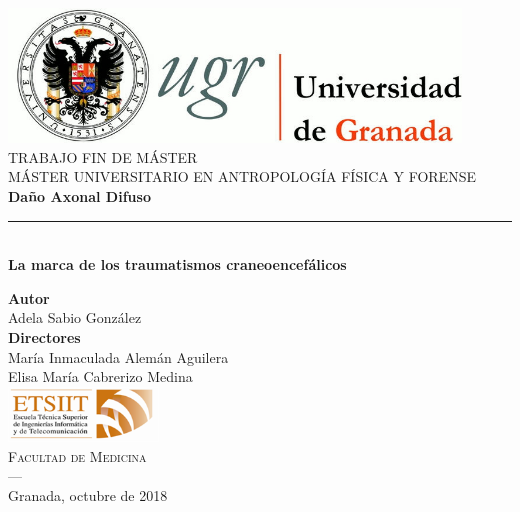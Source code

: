 \begin{titlepage}
 
 
\newlength{\centeroffset}
\setlength{\centeroffset}{-0.5\oddsidemargin}
\addtolength{\centeroffset}{0.5\evensidemargin}
\thispagestyle{empty}

\noindent\hspace*{\centeroffset}\begin{minipage}{\textwidth}

\centering
\includegraphics[width=0.9\textwidth]{imagenes/logo_ugr.jpg}\\[1.4cm]

\textsc{ \Large TRABAJO FIN DE MÁSTER\\[0.2cm]}
\textsc{ MÁSTER UNIVERSITARIO EN ANTROPOLOGÍA FÍSICA Y FORENSE}\\[1cm]
% 
{\Huge\bfseries Daño Axonal Difuso\\
}
\noindent\rule[-1ex]{\textwidth}{3pt}\\[3.5ex]
{\large\bfseries La marca de los traumatismos craneoencefálicos}
\end{minipage}

\vspace{2.5cm}
\noindent\hspace*{\centeroffset}\begin{minipage}{\textwidth}
\centering

\textbf{Autor}\\ {Adela Sabio González}\\[2.5ex]
\textbf{Directores}\\
{María Inmaculada Alemán Aguilera\\
Elisa María Cabrerizo Medina}\\[2cm]
\includegraphics[width=0.3\textwidth]{imagenes/etsiit_logo.png}\\[0.1cm]
\textsc{Facultad de Medicina}\\
\textsc{---}\\
Granada, octubre de 2018
\end{minipage}
\end{titlepage}


